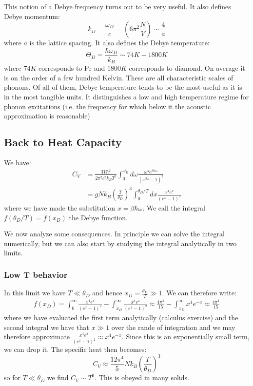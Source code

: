This notion of a Debye frequency turns out to be very useful. It also defines Debye momentum:
\begin{equation}
    k_D = \frac{\omega_D}{c} = \left(6\pi^2\frac{N}{V}\right) \sim \frac{4}{a}
\end{equation}
where $a$ is the lattice spacing. It also defines the Debye temperature:
\begin{equation}
    \Theta_D = \frac{\hbar\omega_D}{k_B} \sim 74\si{K} - 1800\si{K}
\end{equation}
where $74\si{K}$ corresponds to Pr and $1800\si{K}$ corresponds to diamond. On average it is on the order of a few hundred Kelvin. These are all characteristic scales of phonons. Of all of them, Debye temperature tends to be the most useful as it is in the most tangible units. It distinguishes a low and high temperature regime for phonon excitations (i.e. the frequency for which below it the acoustic approximation is reasonable)

\subsection{Back to Heat Capacity}
We have:
\begin{equation}
    \begin{split}
        C_V &= \frac{3V\hbar^2}{2\pi^2c^2k_BT^2}\int_0^{\omega_B}d\omega \frac{\omega^4 e^{\beta\hbar\omega}}{(e^{\beta\bar\omega} - 1)^2}
        \\ &= gNk_B\left(\frac{T}{\theta_D}\right)^3\int_0^{\theta_D/T} dx \frac{x^4e^x}{(e^x - 1)^2}
    \end{split}
\end{equation}
where we have made the substitution $x = \beta\hbar\omega$. We call the integral $f(\theta_D/T) = f(x_D)$ the Debye function.

We now analyze some consequences. In principle we can solve the integral numerically, but we can also start by studying the integral analytically in two limits.

\subsubsection{Low T behavior}
In this limit we have $T \ll \theta_D$ and hence $x_D = \frac{\theta_D}{T} \gg 1$. We can therefore write:
\begin{align*}
    f(x_D) = \int_0^\infty \frac{x^4 e^x}{(e^x - 1)^2} - \int_{x_D}^\infty \frac{x^4 e^x}{(e^x - 1)^2} \approx \frac{4\pi^4}{15} - \int_{x_D}^\infty x^4 e^{-x} \approx \frac{4\pi^4}{15}
\end{align*}
where we have evaluated the first term analytically (calculus exercise) and the second integral we have that $x \gg 1$ over the rande of integration and we may therefore approximate $\frac{x^4e^x}{(e^x - 1)^2} \approx x^4 e^{-x}$. Since this is an exponentially small term, we can drop it. The specific heat then becomes:
\begin{equation}
    C_V \approx \frac{12\pi^4}{5}Nk_B\left(\frac{T}{\theta_D}\right)^3
\end{equation}
so for $T \ll \theta_D$ we find $C_V \sim T^3$. This is obeyed in many solids.

